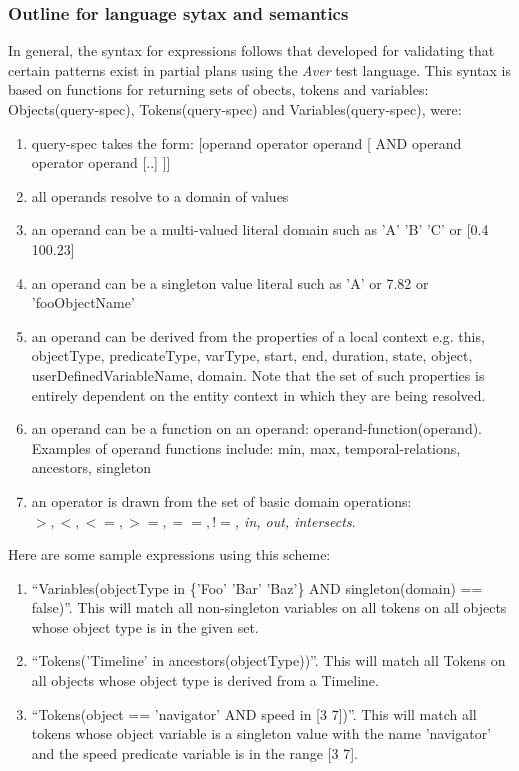 \documentclass[10pt, letterpaper, oneside]{article}
\begin{document}
\subsubsection{Outline for language sytax and semantics}
In general, the syntax for expressions follows that developed for validating that certain patterns exist in partial plans using the {\em Aver} test language. This syntax is based on functions for returning sets of obects, tokens and variables: Objects(query-spec), Tokens(query-spec) and Variables(query-spec), were:
\begin{enumerate}
\item query-spec takes the form: [operand operator operand [ AND operand operator operand [..] ]]
\item all operands resolve to a domain of values
\item an operand can be a multi-valued literal domain such as {'A' 'B' 'C'} or [0.4 100.23]
\item an operand can be a singleton value literal such as 'A' or 7.82 or 'fooObjectName'
\item an operand can be derived from the properties of a local context e.g. this, objectType, predicateType, varType,  start, end, duration, state, object, userDefinedVariableName, domain. Note that the set of such properties is entirely dependent on the entity context in which they are being resolved.
\item an operand can be a function on an operand: operand-function(operand). Examples of operand functions include: min, max, temporal-relations, ancestors, singleton
\item an operator is drawn from the set of basic domain operations: {\em $>, <, <=, >=, ==, !=$, in, out, intersects}.
\end{enumerate}

Here are some sample expressions using this scheme:
\begin{enumerate}
\item ``Variables(objectType in \{'Foo' 'Bar' 'Baz'\} AND singleton(domain) == false)''. This will match all non-singleton variables on all tokens on all objects whose object type is in the given set.
\item ``Tokens('Timeline' in ancestors(objectType))''. This will match all Tokens on all objects whose object type is derived from a Timeline.
\item ``Tokens(object == 'navigator' AND speed in [3 7])''. This will match all tokens whose object variable is a singleton value with the name 'navigator' and the speed predicate variable is in the range [3 7].
\end{enumerate}
\end{document}
